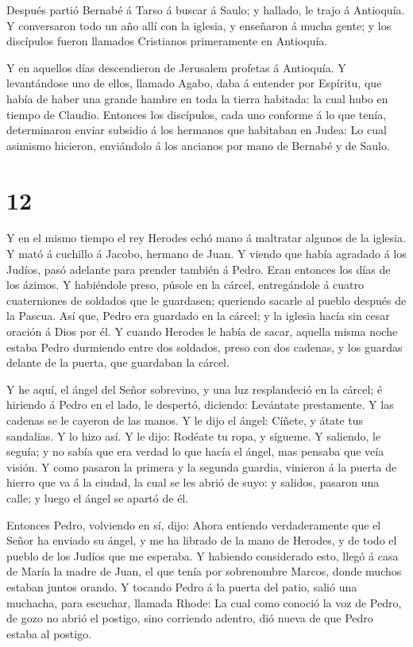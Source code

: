  Después partió Bernabé á Tarso á buscar á Saulo; y
hallado, le trajo á Antioquía.  Y conversaron todo un año
allí con la iglesia, y enseñaron á mucha gente; y los discípulos fueron
llamados Cristianos primeramente en Antioquía.

 Y en aquellos días descendieron de Jerusalem profetas á
Antioquía.  Y levantándose uno de ellos, llamado Agabo,
daba á entender por Espíritu, que había de haber una grande hambre en
toda la tierra habitada: la cual hubo en tiempo de Claudio.
 Entonces los discípulos, cada uno conforme á lo que tenía,
determinaron enviar subsidio á los hermanos que habitaban en Judea:
 Lo cual asimismo hicieron, enviándolo á los ancianos por
mano de Bernabé y de Saulo.

\hypertarget{section-11}{%
\section{12}\label{section-11}}

 Y en el mismo tiempo el rey Herodes echó mano á maltratar
algunos de la iglesia.  Y mató á cuchillo á Jacobo, hermano
de Juan.  Y viendo que había agradado á los Judíos, pasó
adelante para prender también á Pedro. Eran entonces los días de los
ázimos.  Y habiéndole preso, púsole en la cárcel,
entregándole á cuatro cuaterniones de soldados que le guardasen;
queriendo sacarle al pueblo después de la Pascua.  Así que,
Pedro era guardado en la cárcel; y la iglesia hacía sin cesar oración á
Dios por él.  Y cuando Herodes le había de sacar, aquella
misma noche estaba Pedro durmiendo entre dos soldados, preso con dos
cadenas, y los guardas delante de la puerta, que guardaban la cárcel.

 Y he aquí, el ángel del Señor sobrevino, y una luz
resplandeció en la cárcel; é hiriendo á Pedro en el lado, le despertó,
diciendo: Levántate prestamente. Y las cadenas se le cayeron de las
manos.  Y le dijo el ángel: Cíñete, y átate tus sandalias. Y
lo hizo así. Y le dijo: Rodéate tu ropa, y sígueme.  Y
saliendo, le seguía; y no sabía que era verdad lo que hacía el ángel,
mas pensaba que veía visión.  Y como pasaron la primera y
la segunda guardia, vinieron á la puerta de hierro que va á la ciudad,
la cual se les abrió de suyo: y salidos, pasaron una calle; y luego el
ángel se apartó de él.

 Entonces Pedro, volviendo en sí, dijo: Ahora entiendo
verdaderamente que el Señor ha enviado su ángel, y me ha librado de la
mano de Herodes, y de todo el pueblo de los Judíos que me esperaba.
 Y habiendo considerado esto, llegó á casa de María la
madre de Juan, el que tenía por sobrenombre Marcos, donde muchos estaban
juntos orando.  Y tocando Pedro á la puerta del patio,
salió una muchacha, para escuchar, llamada Rhode:  La cual
como conoció la voz de Pedro, de gozo no abrió el postigo, sino
corriendo adentro, dió nueva de que Pedro estaba al postigo.

